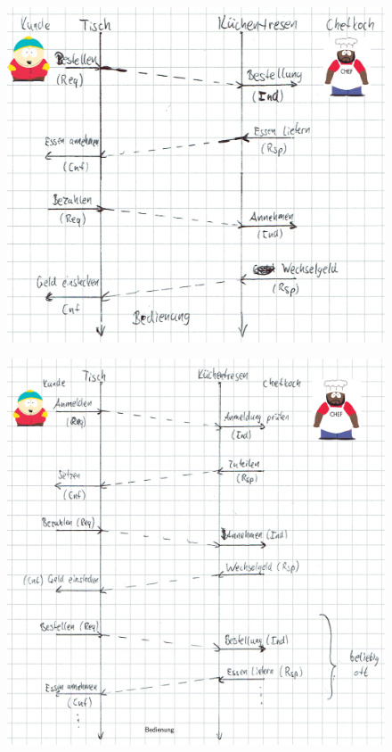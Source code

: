 \documentclass{../exercisesheet}
\begin{document}
\begin{exercise}{5}
	\begin{subexercise}
		\begin{figure}[h]
  			\centering
  			\includegraphics{1_2a.png}
		\end{figure}
	\end{subexercise}
	\newpage
	\begin{subexercise}
		  \begin{figure}[h]
  			\centering
  			\includegraphics{1_2b.png}
		\end{figure}
	\end{subexercise}
\end{exercise}
\end{document}
